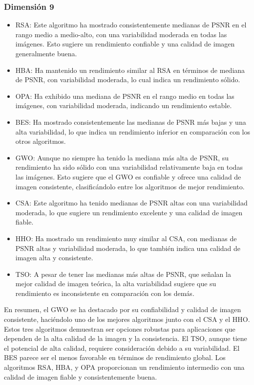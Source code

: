 \documentclass[conference]{IEEEtran}
\begin{document}
\subsubsection{Dimensión 9}
\begin{itemize}
\item RSA: Este algoritmo ha mostrado consistentemente medianas de PSNR en el rango medio a medio-alto, con una variabilidad moderada en todas las imágenes. Esto sugiere un rendimiento confiable y una calidad de imagen generalmente buena.
	
\item HBA: Ha mantenido un rendimiento similar al RSA en términos de mediana de PSNR, con variabilidad moderada, lo cual indica un rendimiento sólido.
	
\item OPA: Ha exhibido una mediana de PSNR en el rango medio en todas las imágenes, con variabilidad moderada, indicando un rendimiento estable.
	
\item BES: Ha mostrado consistentemente las medianas de PSNR más bajas y una alta variabilidad, lo que indica un rendimiento inferior en comparación con los otros algoritmos.
	
\item GWO: Aunque no siempre ha tenido la mediana más alta de PSNR, su rendimiento ha sido sólido con una variabilidad relativamente baja en todas las imágenes. Esto sugiere que el GWO es confiable y ofrece una calidad de imagen consistente, clasificándolo entre los algoritmos de mejor rendimiento.
	
\item CSA: Este algoritmo ha tenido medianas de PSNR altas con una variabilidad moderada, lo que sugiere un rendimiento excelente y una calidad de imagen fiable.
	
\item HHO: Ha mostrado un rendimiento muy similar al CSA, con medianas de PSNR altas y variabilidad moderada, lo que también indica una calidad de imagen alta y consistente.
	
\item TSO: A pesar de tener las medianas más altas de PSNR, que señalan la mejor calidad de imagen teórica, la alta variabilidad sugiere que su rendimiento es inconsistente en comparación con los demás.
	
\end{itemize}
En resumen, el GWO se ha destacado por su confiabilidad y calidad de imagen consistente, haciéndolo uno de los mejores algoritmos junto con el CSA y el HHO. Estos tres algoritmos demuestran ser opciones robustas para aplicaciones que dependen de la alta calidad de la imagen y la consistencia. El TSO, aunque tiene el potencial de alta calidad, requiere consideración debido a su variabilidad. El BES parece ser el menos favorable en términos de rendimiento global. Los algoritmos RSA, HBA, y OPA proporcionan un rendimiento intermedio con una calidad de imagen fiable y consistentemente buena.
\end{document}
